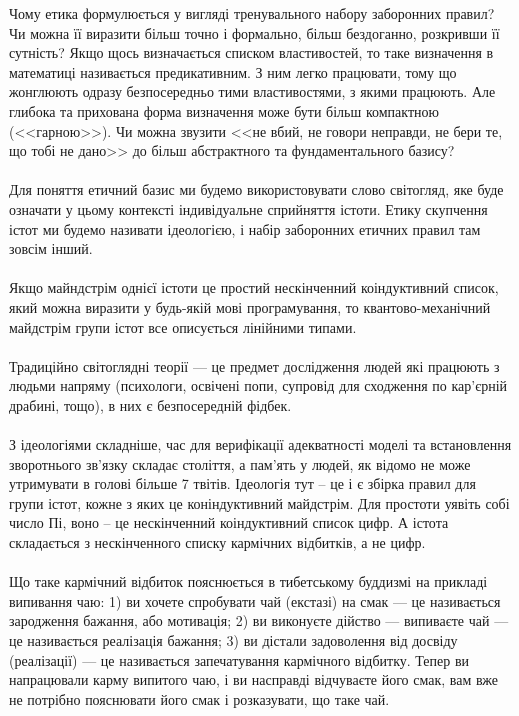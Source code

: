 Чому етика формулюється у вигляді тренувального набору заборонних правил?
Чи можна її виразити більш точно і формально, більш бездоганно, розкривши її сутність?
Якщо щось визначається списком властивостей, то таке визначення в математиці називається
предикативним. З ним легко працювати, тому що жонглюють одразу безпосередньо тими
властивостями, з якими працюють.
Але глибока та прихована форма визначення може бути більш компактною (<<гарною>>).
Чи можна звузити <<не вбий, не говори неправди, не бери те, що тобі не дано>> до
більш абстрактного та фундаментального базису?
\\
\\
Для поняття етичний базис ми будемо використовувати слово світогляд, яке буде
означати у цьому контексті індивідуальне сприйняття істоти. Етику скупчення істот ми
будемо називати ідеологією, і набір заборонних етичних правил там зовсім інший.
\\
\\
Якщо майндстрім однієї істоти це простий нескінченний коіндуктивний список,
який можна виразити у будь-якій мові програмування, то квантово-механічний майдстрім
групи істот все описується лінійними типами.\
\\
\\
Традиційно світоглядні теорії --- це предмет дослідження людей які працюють з людьми напряму
(психологи, освічені попи, супровід для сходження по кар'єрній драбині, тощо), в них
є безпосередній фідбек.
\\
\\
З ідеологіями складніше, час для верифікації адекватності моделі та встановлення зворотнього зв'язку
складає століття, а пам'ять у людей, як відомо не може утримувати в голові більше 7 твітів.
Ідеологія тут -- це і є збірка правил для групи істот, кожне з яких це коніндуктивний майдстрім.
Для простоти уявіть собі число Пі, воно -- це нескінченний коіндуктивний список цифр. А істота
складається з нескінченного списку кармічних відбитків, а не цифр.
\\
\\
Що таке кармічний відбиток пояснюється в тибетському буддизмі на прикладі випивання чаю:
1) ви хочете спробувати чай (екстазі) на смак --- це називається зародження бажання, або мотивація;
2) ви виконуєте дійство --- випиваєте чай --- це називається реалізація бажання;
3) ви дістали задоволення від досвіду (реалізації) --- це називається запечатування кармічного відбитку.
Тепер ви напрацювали карму випитого чаю, і ви насправді відчуваєте його смак, вам вже не потрібно
пояснювати його смак і розказувати, що таке чай.\\
